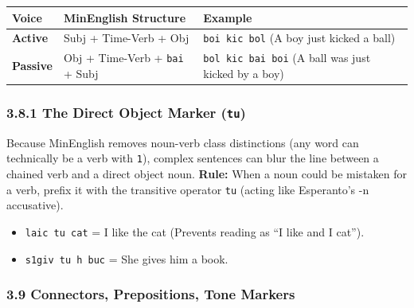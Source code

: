{\def\LTcaptype{} %
\begin{longtable}[]{@{}
  >{\raggedright\arraybackslash}p{}
  >{\raggedright\arraybackslash}p{}
  >{\raggedright\arraybackslash}p{}@{}}
\toprule\noalign{}
\begin{minipage}[b]{\linewidth}\raggedright
Voice
\end{minipage} & \begin{minipage}[b]{\linewidth}\raggedright
MinEnglish Structure
\end{minipage} & \begin{minipage}[b]{\linewidth}\raggedright
Example
\end{minipage} \\
\midrule\noalign{}
\endhead
\bottomrule\noalign{}
\endlastfoot
\textbf{Active} & Subj + Time-Verb + Obj & \texttt{boi\ kic\ bol} (A boy
just kicked a ball) \\
\textbf{Passive} & Obj + Time-Verb + \texttt{bai} + Subj &
\texttt{bol\ kic\ bai\ boi} (A ball was just kicked by a boy) \\
\end{longtable}
}

\subsubsection{\texorpdfstring{3.8.1 The Direct Object Marker
(\texttt{tu})}{3.8.1 The Direct Object Marker (tu)}}\label{the-direct-object-marker-tu}

Because MinEnglish removes noun-verb class distinctions (any word can
technically be a verb with \texttt{1}), complex sentences can blur the
line between a chained verb and a direct object noun. \textbf{Rule:}
When a noun could be mistaken for a verb, prefix it with the transitive
operator \texttt{tu} (acting like Esperanto's -n accusative).

\begin{itemize}
\tightlist
\item
  \texttt{laic\ tu\ cat} = I like the cat (Prevents reading as ``I like
  and I cat'').
\item
  \texttt{s1giv\ tu\ h\ buc} = She gives him a book.
\end{itemize}

\subsubsection{3.9 Connectors, Prepositions, Tone
Markers}\label{connectors-prepositions-tone-markers}

